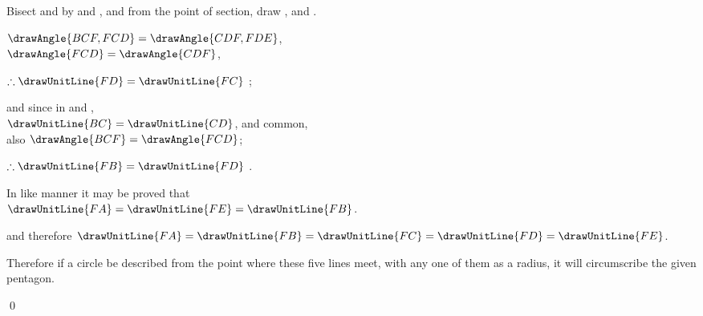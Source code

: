 \documentclass[booklanguage=english]{byrnebook}
\begin{document}
\begin{center}
Bisect  and  by  and , and from the point of section, draw ,  and .

$\drawAngle{BCF,FCD} = \drawAngle{CDF,FDE}$,\\
$\drawAngle{FCD} = \drawAngle{CDF}$,

$\therefore \drawUnitLine{FD} = \drawUnitLine{FC}$ ;

and since in
and
,\\
$\drawUnitLine{BC} = \drawUnitLine{CD}$, and  common,\\
also $\drawAngle{BCF} = \drawAngle{FCD}$;

$\therefore \drawUnitLine{FB} = \drawUnitLine{FD}$ .

In like manner it may be proved that\\
$\drawUnitLine{FA} = \drawUnitLine{FE} = \drawUnitLine{FB}$.

and therefore $\drawUnitLine{FA} = \drawUnitLine{FB} = \drawUnitLine{FC} = \drawUnitLine{FD} = \drawUnitLine{FE}$.
\end{center}

Therefore if a circle be described from the point where these five lines meet, with any one of them as a radius, it will circumscribe the given pentagon.

\qed
\end{document}

